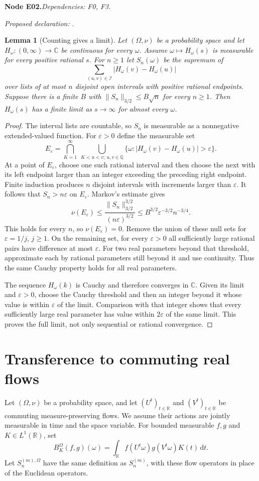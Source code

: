 \documentclass[11pt]{article}
\newtheorem{lemma}[theorem]{Lemma}
\theoremstyle{remark}\newtheorem{remark}[theorem]{Remark}
\newcommand{\R}{\mathbb R}\newcommand{\C}{\mathbb C}
\newcommand{\dd}{\,\mathrm d}\newcommand{\tr}{\operatorname{tr}}
\newcommand{\bpnode}[3]{\par\Needspace{5\baselineskip}\noindent\textbf{Node #1.}\quad\textit{Dependencies: #2.}\par\noindent\textit{Proposed declaration:} \texttt{\detokenize{#3}}.\par\smallskip}
\begin{document}
\bpnode{E02}{F0, F3}{square_root_counting_implies_ae_Cauchy}
\begin{lemma}[Counting gives a limit]\label{lem:counting-limit}
Let $(\Omega,\nu)$ be a probability space and let $H_\omega:(0,\infty)\to\C$ be continuous for every $\omega$. Assume $\omega\mapsto H_\omega(s)$ is measurable for every positive rational $s$. For $n\ge1$ let $S_n(\omega)$ be the supremum of
\[
 \sum_{(u,v)\in\mathcal I}|H_\omega(v)-H_\omega(u)|
\]
over lists of at most $n$ disjoint open intervals with positive rational endpoints. Suppose there is a finite $B$ with $\|S_n\|_{3/2}\le B\sqrt n$ for every $n\ge1$. Then $H_\omega(s)$ has a finite limit as $s\to\infty$ for almost every $\omega$.
\end{lemma}
\begin{proof}
The interval lists are countable, so $S_n$ is measurable as a nonnegative extended-valued function. For $\varepsilon>0$ define the measurable set
\[
 E_\varepsilon=\bigcap_{K=1}^\infty\ 
  \bigcup_{K<u<v;\ u,v\in\mathbb Q}
   \{\omega:|H_\omega(v)-H_\omega(u)|>\varepsilon\}.
\]
At a point of $E_\varepsilon$, choose one such rational interval and then choose the next with its left endpoint larger than an integer exceeding the preceding right endpoint. Finite induction produces $n$ disjoint intervals with increments larger than $\varepsilon$. It follows that $S_n>n\varepsilon$ on $E_\varepsilon$. Markov's estimate gives
\[
 \nu(E_\varepsilon)\le\frac{\|S_n\|_{3/2}^{3/2}}{(n\varepsilon)^{3/2}}
 \le B^{3/2}\varepsilon^{-3/2}n^{-3/4}.
\]
This holds for every $n$, so $\nu(E_\varepsilon)=0$. Remove the union of these null sets for $\varepsilon=1/j$, $j\ge1$. On the remaining set, for every $\varepsilon>0$ all sufficiently large rational pairs have difference at most $\varepsilon$. For two real parameters beyond that threshold, approximate each by rational parameters still beyond it and use continuity. Thus the same Cauchy property holds for all real parameters.

The sequence $H_\omega(k)$ is Cauchy and therefore converges in $\C$. Given its limit and $\varepsilon>0$, choose the Cauchy threshold and then an integer beyond it whose value is within $\varepsilon$ of the limit. Comparison with that integer shows that every sufficiently large real parameter has value within $2\varepsilon$ of the same limit. This proves the full limit, not only sequential or rational convergence.
\end{proof}

\section{Transference to commuting real flows}\label{sec:flows}
Let $(\Omega,\nu)$ be a probability space, and let $(U^t)_{t\in\R}$ and $(V^t)_{t\in\R}$ be commuting measure-preserving flows. We assume their actions are jointly measurable in time and the space variable. For bounded measurable $f,g$ and $K\in L^1(\R)$, set
\[
 B_K^{\Omega}(f,g)(\omega)=\int_\R f(U^t\omega)g(V^t\omega)K(t)\dd t.
\]
Let $S_n^{(m),\Omega}$ have the same definition as $S_n^{(m)}$, with these flow operators in place of the Euclidean operators.
\end{document}
